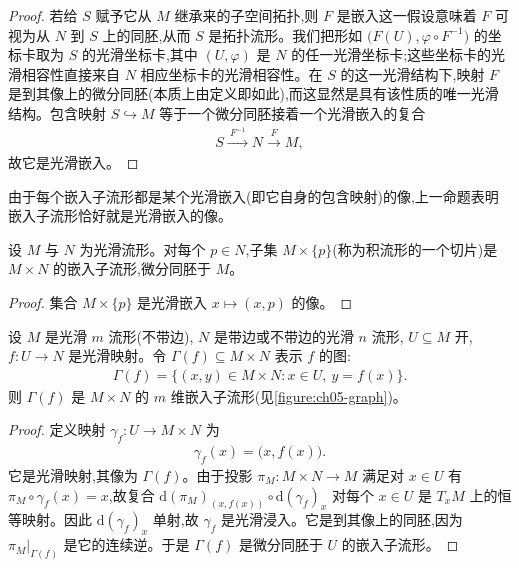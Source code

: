 \documentclass[../../main.tex]{subfiles}
\begin{document}
\begin{proof}
若给 $S$ 赋予它从 $M$ 继承来的子空间拓扑,则 $F$ 是嵌入这一假设意味着 $F$ 可视为从 $N$ 到 $S$ 上的同胚,从而 $S$ 是拓扑流形。我们把形如 $\bigl(F(U),\varphi\circ F^{-1}\bigr)$ 的坐标卡取为 $S$ 的光滑坐标卡,其中 $(U,\varphi)$ 是 $N$ 的任一光滑坐标卡;这些坐标卡的光滑相容性直接来自 $N$ 相应坐标卡的光滑相容性。在 $S$ 的这一光滑结构下,映射 $F$ 是到其像上的微分同胚(本质上由定义即如此),而这显然是具有该性质的唯一光滑结构。包含映射 $S\hookrightarrow M$ 等于一个微分同胚接着一个光滑嵌入的复合
\begin{align}\label{align:ch05-inclusion-factor}
S\xrightarrow{\ F^{-1}\ }N\xrightarrow{\ F\ }M,
\end{align}
故它是光滑嵌入。
\end{proof}

由于每个嵌入子流形都是某个光滑嵌入(即它自身的包含映射)的像,上一命题表明嵌入子流形恰好就是光滑嵌入的像。

\begin{proposition}\label{proposition:ch05-product-slices}
设 $M$ 与 $N$ 为光滑流形。对每个 $p\in N$,子集 $M\times\{p\}$(称为积流形的一个切片)是 $M\times N$ 的嵌入子流形,微分同胚于 $M$。
\end{proposition}

\begin{proof}
集合 $M\times\{p\}$ 是光滑嵌入 $x\mapsto(x,p)$ 的像。
\end{proof}

\begin{proposition}\label{proposition:ch05-graphs}
设 $M$ 是光滑 $m$ 流形(不带边), $N$ 是带边或不带边的光滑 $n$ 流形, $U\subseteq M$ 开, $f:U\to N$ 是光滑映射。令 $\Gamma(f)\subseteq M\times N$ 表示 $f$ 的图:
\begin{align*}
\Gamma(f)=\{(x,y)\in M\times N:x\in U,\ y=f(x)\}.
\end{align*}
则 $\Gamma(f)$ 是 $M\times N$ 的 $m$ 维嵌入子流形(见\cref{figure:ch05-graph})。
\end{proposition}

\begin{proof}
定义映射 $\gamma_f:U\to M\times N$ 为
\begin{align}\label{align:ch05-graph-map}
\gamma_f(x)=\bigl(x,f(x)\bigr).
\end{align}
它是光滑映射,其像为 $\Gamma(f)$。由于投影 $\pi_M:M\times N\to M$ 满足对 $x\in U$ 有 $\pi_M\circ\gamma_f(x)=x$,故复合 $\mathrm{d}(\pi_M)_{(x,f(x))}\circ\mathrm{d}(\gamma_f)_x$ 对每个 $x\in U$ 是 $T_xM$ 上的恒等映射。因此 $\mathrm{d}(\gamma_f)_x$ 单射,故 $\gamma_f$ 是光滑浸入。它是到其像上的同胚,因为 $\pi_M|_{\Gamma(f)}$ 是它的连续逆。于是 $\Gamma(f)$ 是微分同胚于 $U$ 的嵌入子流形。
\end{proof}
\end{document}
